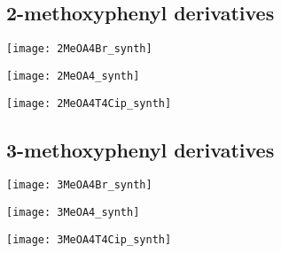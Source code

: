 \subsection{2-methoxyphenyl derivatives}

\begin{scheme}[H]
	\begin{center}
		\texttt{[image: 2MeOA4Br\_synth]}
		\caption{\label{sch:2MeOA4Br_synth}}
	\end{center}
\end{scheme}

\begin{scheme}[H]
	\begin{center}
		\texttt{[image: 2MeOA4\_synth]}
		\caption{\label{sch:2MeOA4_synth}}
	\end{center}
\end{scheme}

\begin{scheme}[H]
	\begin{center}
				\texttt{[image: 2MeOA4T4Cip\_synth]}
		\caption{\label{sch:2MeOA4T4Cip_synth}}
	\end{center}
\end{scheme}

\subsection{3-methoxyphenyl derivatives}

\begin{scheme}[H]
	\begin{center}
		\texttt{[image: 3MeOA4Br\_synth]}
		\caption{\label{sch:3MeOA4Br_synth}}
	\end{center}
\end{scheme}

\begin{scheme}[H]
	\begin{center}
		\texttt{[image: 3MeOA4\_synth]}
		\caption{\label{sch:3MeOA4_synth}}
	\end{center}
\end{scheme}

\begin{scheme}[H]
	\begin{center}
				\texttt{[image: 3MeOA4T4Cip\_synth]}
		\caption{\label{sch:3MeOA4T4Cip_synth}}
	\end{center}
\end{scheme}

